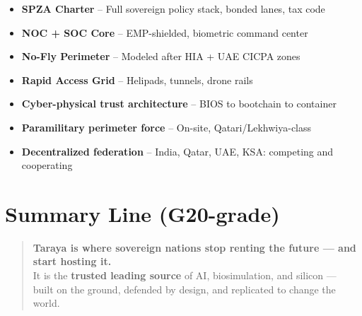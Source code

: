 \documentclass{article}
\begin{document}
  \begin{itemize}
    \item \textbf{SPZA Charter} – Full sovereign policy stack, bonded lanes, tax code
    \item \textbf{NOC + SOC Core} – EMP-shielded, biometric command center
    \item \textbf{No-Fly Perimeter} – Modeled after HIA + UAE CICPA zones
    \item \textbf{Rapid Access Grid} – Helipads, tunnels, drone rails
    \item \textbf{Cyber-physical trust architecture} – BIOS to bootchain to container
    \item \textbf{Paramilitary perimeter force} – On-site, Qatari/Lekhwiya-class
    \item \textbf{Decentralized federation} – India, Qatar, UAE, KSA: competing and cooperating
  \end{itemize}

  \vspace{1em}

  \section*{Summary Line (G20-grade)}

  \begin{quote}
    \textbf{Taraya is where sovereign nations stop renting the future — and start hosting it.} \\
    It is the \textbf{trusted leading source} of AI, biosimulation, and silicon — \\
    built on the ground, defended by design, and replicated to change the world.
  \end{quote}
\end{document}
